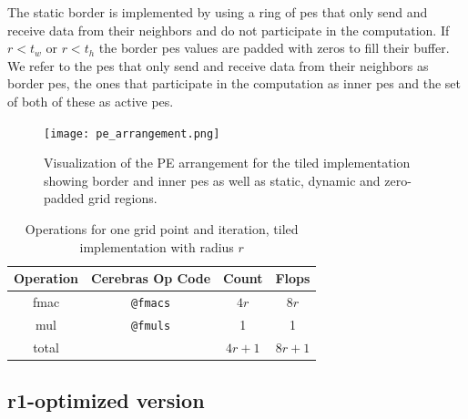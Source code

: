 The static border is implemented by using a ring of \acp{pe} that only send and receive data from their neighbors and do not participate in the computation. If $r<t_w$ or $r<t_h$ the border \acp{pe} values are padded with zeros to fill their buffer. We refer to the \acp{pe} that only send and receive data from their neighbors as border \acp{pe}, the ones that participate in the computation as inner \acp{pe} and the set of both of these as active \acp{pe}.

\begin{figure}
    \centering
    \texttt{[image: pe\_arrangement.png]}
    \caption{Visualization of the PE arrangement for the tiled implementation showing border and inner \acp{pe} as well as static, dynamic and zero-padded grid regions.}
    \label{fig:pe_arrangement}
\end{figure}

\begin{table}[h]
    \centering
    \caption{Operations for one grid point and iteration, tiled implementation with radius $r$}
    \label{tab:tiled_operations}
    \begin{tabular}{@{}cccc@{}}
        \toprule
        Operation & Cerebras Op Code & Count & Flops \\
        \midrule
        fmac & \texttt{@fmacs} & $4r$ & $8r$ \\
        mul & \texttt{@fmuls} & \num{1} & \num{1} \\
        \midrule
        total & & $4r+1$ & $8r+1$ \\
        \bottomrule
    \end{tabular}
\end{table}

\subsection{r1-optimized version}

